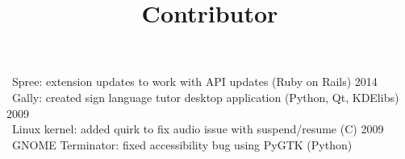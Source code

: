         \dates{}
        \location{}
        \title{Contributor}
        \begin{position}
            \textbullet \ Spree: extension updates to work with API updates (Ruby on Rails) 2014\\
            \textbullet \ Gally: created sign language tutor desktop application (Python, Qt, KDElibs) 2009\\
            \textbullet \ Linux kernel: added quirk to fix audio issue with suspend/resume (C) 2009\\
            \textbullet \ GNOME Terminator: fixed accessibility bug using PyGTK (Python)
        \end{position}
